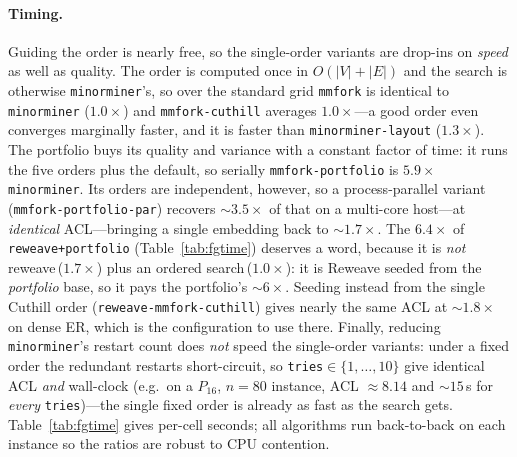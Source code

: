 \documentclass[acmsmall,anonymous,nonacm]{acmart}
\begin{document}
\paragraph{Timing.} Guiding the order is nearly free, so the single-order variants
are drop-ins on \emph{speed} as well as quality. The order is computed once in
$O(|V|{+}|E|)$ and the search is otherwise \texttt{minorminer}'s, so over the
standard grid \texttt{mmfork} is identical to \texttt{minorminer} ($1.0\times$) and
\texttt{mmfork-cuthill} averages $1.0\times$---a good order even converges
marginally faster, and it is faster than \texttt{minorminer-layout} ($1.3\times$).
The portfolio buys its quality and variance with a constant factor of time: it runs
the five orders plus the default, so serially \texttt{mmfork-portfolio} is
$5.9\times$ \texttt{minorminer}. Its orders are independent, however, so a
process-parallel variant (\texttt{mmfork-portfolio-par}) recovers ${\sim}3.5\times$
of that on a multi-core host---at \emph{identical} ACL---bringing a single embedding
back to ${\sim}1.7\times$. The $6.4\times$ of \texttt{reweave+portfolio}
(Table~\ref{tab:fgtime}) deserves a word, because it is \emph{not}
reweave\,($1.7\times$) plus an ordered search\,($1.0\times$): it is Reweave seeded
from the
\emph{portfolio} base, so it pays the portfolio's ${\sim}6\times$. Seeding instead
from the single Cuthill order (\texttt{reweave-mmfork-cuthill}) gives nearly the same
ACL at ${\sim}1.8\times$ on dense ER, which is the configuration to use there. Finally, reducing
\texttt{minorminer}'s restart count does \emph{not} speed the single-order variants:
under a fixed order the redundant restarts short-circuit, so \texttt{tries}$\in\{1,
\dots,10\}$ give identical ACL \emph{and} wall-clock (e.g.\ on a $P_{16}$,
$n{=}80$ instance, ACL ${\approx}8.14$ and ${\sim}15$\,s for \emph{every}
\texttt{tries})---the single fixed order is already as fast as the search gets. Table~\ref{tab:fgtime} gives per-cell seconds;
all algorithms run back-to-back on each instance so the ratios are robust to CPU
contention.
\end{document}
